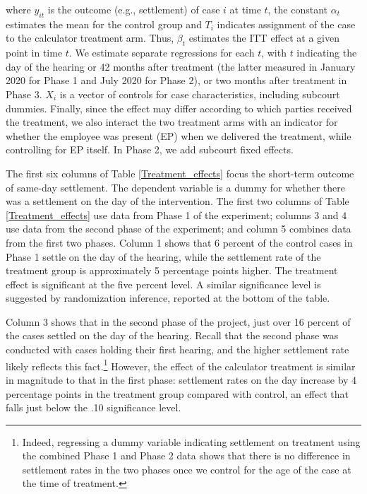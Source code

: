 \documentclass[11pt, a4paper]{article}
\begin{document}
where $y_{it}$ is the outcome (e.g., settlement) of case $i$ at time $t$, the constant $\alpha_t$ estimates the mean for the control group and $T_{i}$ indicates assignment of the case to the calculator treatment arm. Thus, $\beta_t$ estimates the ITT effect at a given point in time $t$. We estimate separate regressions for each $t$, with $t$ indicating the day of the hearing or 42 months after treatment (the latter measured in January 2020 for Phase 1 and July 2020 for Phase 2), or two months after treatment in Phase 3. \textbf{$X_i$} is a vector of controls for case characteristics, including subcourt dummies. Finally, since the effect may differ according to which parties received the treatment, we also interact the two treatment arms with an indicator for whether the employee was present (EP) when we delivered the treatment, while controlling for EP itself. In Phase 2, we add subcourt fixed effects.

The first six columns of Table \ref{Treatment_effects} focus the short-term outcome of same-day settlement. The dependent variable is a dummy for whether there was a settlement on the day of the intervention. The first two columns of Table \ref{Treatment_effects} use data from Phase 1 of the experiment; columns 3 and 4 use data from the second phase of the experiment; and column 5 combines data from the first two phases. Column 1 shows that 6 percent of the control cases in Phase 1 settle on the day of the hearing, while the settlement rate of the treatment group is approximately 5 percentage points higher. The treatment effect is significant at the five percent level. A similar significance level is suggested by randomization inference, reported at the bottom of the table. 

Column 3 shows that in the second phase of the project, just over 16 percent of the cases settled on the day of the hearing. Recall that the second phase was conducted with cases holding their first hearing, and the higher settlement rate likely reflects this fact.\footnote{Indeed, regressing a dummy variable indicating settlement on treatment using the combined Phase 1 and Phase 2 data shows that there is no difference in settlement rates in the two phases once we control for the age of the case at the time of treatment.} However, the effect of the calculator treatment is similar in magnitude to that in the first phase: settlement rates on the day increase by 4 percentage points in the treatment group compared with control, an effect that falls just below the .10 significance level.
\end{document}
